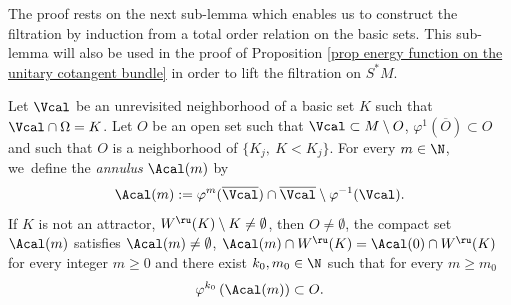 The proof rests on the next sub-lemma which enables us to construct the filtration by induction from a total order relation on the basic sets. This sub-lemma will also be used in the proof of Proposition \ref{prop energy function on the unitary cotangent bundle} in order to lift the filtration on $S^* M$.

\begin{sublemma}\label{Sublemma: uniform traveling time for unstable annulus}
Let $\Vcal$ be an unrevisited neighborhood of a basic set $K$ such that $\Vcal \cap \Omega = K$. Let $O$ be an open set such that $\Vcal \subset M\setminus O$, $\varphi^1 (\overline{O}) \subset O$ and such that $O$ is a neighborhood of $\{K_j, \: K < K_j \}$. For every $m \in \N$, we~define the \textit{annulus} $\Acal (m)$ by
\[
\Acal (m):= \varphi^m (\overline{\Vcal}) \cap \overline{\Vcal} \setminus \varphi^{-1}(\Vcal).
\]
If $K$ is not an attractor, \ie $W^\ru (K) \setminus K \neq \emptyset$, then $O \neq \emptyset$, the compact set $\Acal (m)$ satisfies $\Acal (m) \neq \emptyset$, $\Acal(m) \cap W^\ru (K) = \Acal(0) \cap W^\ru (K)$ for every integer $m \geq 0$ and
there exist $k_0, m_0 \in \N$ such that for every $m\geq m_0$
\[
\varphi^{k_0} \left(\Acal (m) \right) \subset O.
\]
\end{sublemma}

